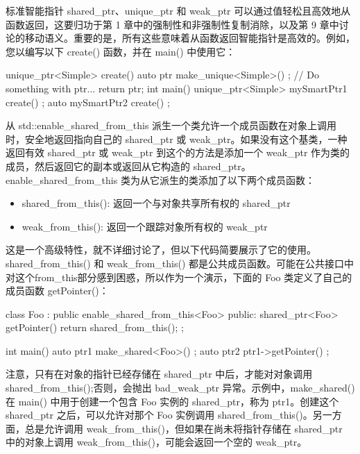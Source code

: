
标准智能指针 shared\_ptr、unique\_ptr 和 weak\_ptr 可以通过值轻松且高效地从函数返回，这要归功于第 1 章中的强制性和非强制性复制消除，以及第 9 章中讨论的移动语义。重要的是，所有这些意味着从函数返回智能指针是高效的。例如，您以编写以下 create() 函数，并在 main() 中使用它：

\begin{cpp}
unique_ptr<Simple> create()
{
    auto ptr { make_unique<Simple>() };
    // Do something with ptr...
    return ptr;
}
int main()
{
    unique_ptr<Simple> mySmartPtr1 { create() };
    auto mySmartPtr2 { create() };
}

\end{cpp}


从 std::enable\_shared\_from\_this 派生一个类允许一个成员函数在对象上调用时，安全地返回指向自己的 shared\_ptr 或 weak\_ptr。如果没有这个基类，一种返回有效 shared\_ptr 或 weak\_ptr 到这个的方法是添加一个 weak\_ptr 作为类的成员，然后返回它的副本或返回从它构造的 shared\_ptr。enable\_shared\_from\_this 类为从它派生的类添加了以下两个成员函数：

\begin{itemize}
\item
shared\_from\_this(): 返回一个与对象共享所有权的 shared\_ptr

\item
weak\_from\_this(): 返回一个跟踪对象所有权的 weak\_ptr
\end{itemize}

这是一个高级特性，就不详细讨论了，但以下代码简要展示了它的使用。shared\_from\_this() 和 weak\_from\_this() 都是公共成员函数。可能在公共接口中对这个from\_this部分感到困惑，所以作为一个演示，下面的 Foo 类定义了自己的成员函数 getPointer()：

\begin{cpp}
class Foo : public enable_shared_from_this<Foo>
{
    public:
        shared_ptr<Foo> getPointer() {
            return shared_from_this();
        }
};

int main()
{
    auto ptr1 { make_shared<Foo>() };
    auto ptr2 { ptr1->getPointer() };
}

\end{cpp}

注意，只有在对象的指针已经存储在 shared\_ptr 中后，才能对对象调用 shared\_from\_this();否则，会抛出 bad\_weak\_ptr 异常。示例中，make\_shared() 在 main() 中用于创建一个包含 Foo 实例的 shared\_ptr，称为 ptr1。创建这个 shared\_ptr 之后，可以允许对那个 Foo 实例调用 shared\_from\_this()。另一方面，总是允许调用 weak\_from\_this()，但如果在尚未将指针存储在 shared\_ptr 中的对象上调用 weak\_from\_this()，可能会返回一个空的 weak\_ptr。


